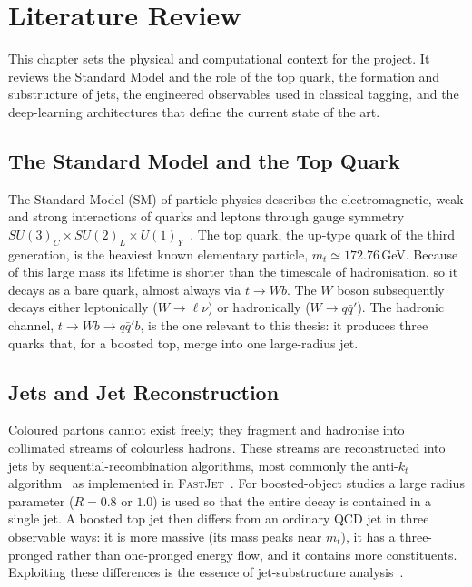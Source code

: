 \chapter{Literature Review}
\label{chap:literature_review}

This chapter sets the physical and computational context for the project. It
reviews the Standard Model and the role of the top quark, the formation and
substructure of jets, the engineered observables used in classical tagging,
and the deep-learning architectures that define the current state of the art.

\section{The Standard Model and the Top Quark}
\label{sec:sm}

The Standard Model (SM) of particle physics describes the electromagnetic,
weak and strong interactions of quarks and leptons through gauge symmetry
$SU(3)_C\times SU(2)_L\times U(1)_Y$~\citep{pdg2022}. The top quark, the
up-type quark of the third generation, is the heaviest known elementary
particle, $m_t\simeq172.76$\,GeV. Because of this large mass its lifetime is
shorter than the timescale of hadronisation, so it decays as a bare quark,
almost always via $t\rightarrow Wb$. The $W$ boson subsequently decays either
leptonically ($W\rightarrow\ell\nu$) or hadronically
($W\rightarrow q\bar{q}'$). The hadronic channel,
$t\rightarrow Wb\rightarrow q\bar{q}'b$, is the one relevant to this thesis:
it produces three quarks that, for a boosted top, merge into one
large-radius jet.

\section{Jets and Jet Reconstruction}
\label{sec:jets}

Coloured partons cannot exist freely; they fragment and hadronise into
collimated streams of colourless hadrons. These streams are reconstructed
into jets by sequential-recombination algorithms, most commonly the
anti-$k_t$ algorithm~\citep{cacciari2008} as implemented in
\textsc{FastJet}~\citep{cacciari2012fastjet}. For boosted-object studies a
large radius parameter ($R=0.8$ or $1.0$) is used so that the entire decay is
contained in a single jet. A boosted top jet then differs from an ordinary
QCD jet in three observable ways: it is more massive (its mass peaks near
$m_t$), it has a three-pronged rather than one-pronged energy flow, and it
contains more constituents. Exploiting these differences is the essence of
jet-substructure analysis~\citep{larkoski2020,kogler2019}.

